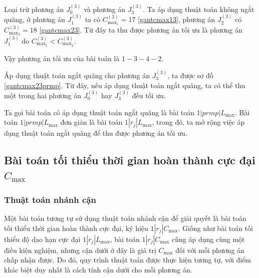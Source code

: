 \begin{vd}
Loại trừ phương án $J_0^{(3)}$ và phương án $J_3^{(3)}$. Ta áp dụng thuật toán không ngắt quãng, ở phương án $J_1^{(3)}$ ta có $C_{\max _1}^{(3)} = 17$ \eqref{gantcmax13}, phương án $J_2^{(3)}$ có $C_{\max _2}^{(3)} = 18$ \eqref{gantcmax23}. Từ đây ta thu được phương án tối ưu là phương án $J_1^{(3)}$ do $C_{\max _1}^{(3)} < C_{\max _2}^{(3)}$.

Vậy phương án tối ưu của bài toán là $1-3-4-2$.

Áp dụng thuật toán ngắt quãng cho phương án $J_3^{(3)}$, ta được sơ đồ \eqref{gantcmax23prmp}. Từ đây, nếu áp dụng thuật toán ngắt quãng, ta có thể thu một trong hai phương án $J_0^{(3)}$ hay $J_3^{(3)}$ đều tối ưu.

\end{vd}

Ta gọi bài toán có áp dụng thuật toán ngắt quãng là bài toán $1|prmp|L_{\max}$. Bài toán $1|prmp|L_{\max}$ đơn giản là bài toán $1|r_j|L_{\max}$, trong đó, ta mở rộng việc áp dụng thuật toán ngắt quãng để thu được phương án tối ưu.


\subsection{Bài toán tối thiểu thời gian hoàn thành cực đại $C_{\max}$}




\subsubsection*{Thuật toán nhánh cận}

Một bài toán tương tự sử dụng thuật toán nhánh cận để giải quyết là bài toán tối thiểu thời gian hoàn thành cực đại, ký hiệu $1|r_j|C_{\max}$. Giống như bài toán tối thiểu độ dao hạn cực đại $1|r_j|L_{\max}$, bài toán $1|r_j|C_{\max}$ cũng áp dụng cùng một điều kiện nghiệm, nhưng cận dưới ở đây là giá trị $C_{\max}$ đối với mỗi phương án chấp nhận được. Do đó, quy trình thuật toán được thực hiện tương tự, với điểm khác biệt duy nhất là cách tính cận dưới cho mỗi phương án.

